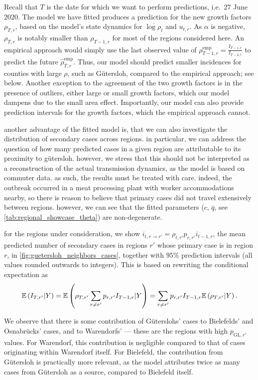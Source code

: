 Recall that $T$ is the date for which we want to perform predictions, i.e.\ 27 June 2020. The model we have fitted produces a prediction for the new growth factors $\rho_{T, r}$, based on the model's state dynamics for $\overline{\log \rho_{t}}$ and $u_{t,r}$. As $\alpha$ is negative, $\rho_{T,r}$ is notably smaller than $\rho_{T - 1, r}$ for most of the regions considered here. An empirical approach would simply use the last observed value of $\rho^{\text{emp}}_{T-1,r} = \frac{I_{T-1,r}}{I_{T - 2, r}}$ to predict the future $\hat\rho^{\text{emp}}_{T, r}$.  Thus, our model should predict smaller incidences for counties with large $\rho$, such as Gütersloh, compared to the empirical approach; see below. Another exception to the agreement of the two growth factors is in the presence of outliers, either large or small growth factors, which our model dampens due to the small area effect. Importantly, our model can also provide prediction intervals for the growth factors, which the empirical approach cannot.

%

another advantage of the fitted model is, that we can also investigate the distribution of secondary cases across regions. in particular, we can address the question of how many predicted cases in a given region are attributable to its proximity to gütersloh. however, we stress that this should not be interpreted as a reconstruction of the actual transmission dynamics, as the model is based on commuter data.  as such, the results must be treated with care. indeed, the outbreak occurred in a meat processing plant with worker accommodations nearby, so there is reason to believe that primary cases did not travel extensively between regions. however, we can see that the fitted parameters ($c$, $\bar q$, see \cref{tab:regional_showcase_theta}) are non-degenerate. 

for the regions under consideration, we show $i_{t, r \to r'} = \rho_{t,r'} p_{r,r'}i_{t-1,r}$, the mean predicted number of secondary cases in regions $r'$ whose primary case is in region $r$, in \cref{fig:guetersloh_neighbors_cases}, together with $95\%$ prediction intervals (all values rounded outwards to integers). This is based on rewriting the conditional expectation as $$\mathbb E \left( I_{T,r'} | Y \right) = \mathbb E \left( \rho_{T,r'} \sum_{r\neq r'} p_{r,r'} I_{T-1, r} | Y \right) = \sum_{r\neq r'} p_{r,r'} I_{T-1, r} \mathbb E \left( \rho_{T,r'} | Y \right).$$ 

We observe that there is some contribution of Güterslohs' cases to Bielefelds' and Osnabrücks' cases, and to Warendorfs' --- these are the regions with high $p_{\text{GL}, r'}$ values. For Warendorf, this contribution is negligible compared to that of cases originating within Warendorf itself. For Bielefeld, the contribution from Gütersloh is practically more relevant, as the model attributes twice as many cases from Gütersloh as a source, compared to Bielefeld itself.  %

